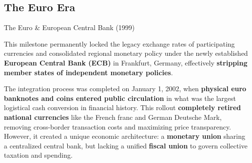 \documentclass[10pt]{article}
\begin{document}
  \subsection{The Euro Era}

    \begin{core}[label=core:euro_intro]{The Euro \& European Central Bank (1999)}


      This milestone permanently locked the legacy exchange rates of participating currencies and consolidated regional monetary policy under the newly established \textbf{European Central Bank (ECB)} in Frankfurt, Germany, effectively \textbf{stripping member states of independent monetary policies}.

      The integration process was completed on January 1, 2002, when \textbf{physical euro banknotes and coins entered public circulation} in what was the largest logistical cash conversion in financial history. This rollout \textbf{completely retired national currencies} like the French franc and German Deutsche Mark, removing cross-border transaction costs and maximizing price transparency. However, it created a unique economic architecture: a \textbf{monetary union} sharing a centralized central bank, but lacking a unified \textbf{fiscal union} to govern collective taxation and spending.


    \end{core}
\end{document}
